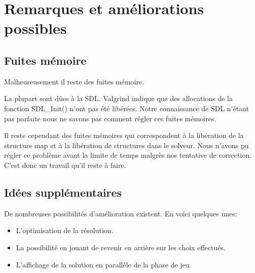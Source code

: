 \chapter{Remarques et améliorations possibles}

\section{Fuites mémoire}

Malheureusement il reste des fuites mémoire.

La plupart sont dûes à la SDL. Valgrind indique que des allocations de la fonction SDL\_Init() n'ont pas été libérées. Notre connaissance de SDL n'étant pas parfaite nous ne savons pas comment régler ces fuites mémoires.

Il reste cependant des fuites mémoires qui correspondent à la libération de la structure map et à la libération de structures dans le solveur.
Nous n'avons pu régler ce problème avant la limite de temps malgrès nos tentative de correction. C'est donc un travail qu'il reste à faire.

\section{Idées supplémentaires}

De nombreuses possibilités d'amélioration existent.
En voici quelques unes:
\begin{itemize}
	\item L'optimisation de la résolution.
	\item La possibilité en jouant de revenir en arrière sur les choix effectués.
    \item L'affichage de la solution en parallèle de la phase de jeu.
\end{itemize}